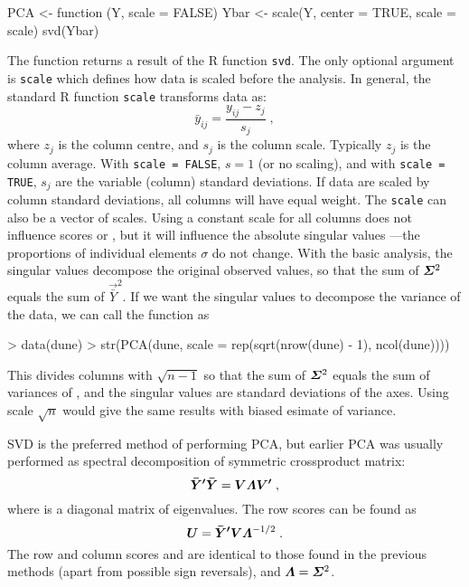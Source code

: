 \begin{Schunk}
\begin{Soutput}
PCA <-
function (Y, scale = FALSE) 
{
    Ybar <- scale(Y, center = TRUE, scale = scale)
    svd(Ybar)
}
\end{Soutput}
\end{Schunk}
The function returns a result of the R function \texttt{svd}. The only
optional argument is \texttt{scale} which defines how data is scaled
before the analysis. In general, the standard R function
\texttt{scale} transforms data as:
\begin{equation}
  \label{eq:PCAstand}
  \bar y_{ij} = \frac{y_{ij} - z_j}{s_j}\;,
\end{equation}
where $z_j$ is the column centre, and $s_j$ is the column
scale. Typically $z_j$ is the column average. With \texttt{scale =
  FALSE}, $s=1$ (or no scaling), and with \texttt{scale = TRUE}, $s_j$
are the variable (column) standard deviations. If data are scaled by
column standard deviations, all columns will have equal weight.  The
\texttt{scale} can also be a vector of scales. Using a constant
scale for all columns does not influence scores  or ,
but it will influence the absolute singular values
\vec{\bSigma}---the proportions of individual elements $\sigma$ do
not change.  With the basic analysis, the singular values decompose
the original observed values, so that the sum of $\vec{\bSigma}^2$
equals the sum of $\vec{\bar Y}^2$. If we want the
singular values to decompose the variance of the data, we can call the
function as

\begin{Schunk}
\begin{Sinput}
> data(dune)
> str(PCA(dune, scale = rep(sqrt(nrow(dune) - 1), ncol(dune))))
\end{Sinput}
\end{Schunk}
This divides columns with $$ so that the sum of
$\vec{\bSigma}^2$ equals the sum of variances of , and the
singular values are standard deviations of the axes.  Using scale
$$ would give the same results with biased esimate of variance.

SVD is the preferred method of performing PCA, but earlier PCA was
usually performed as spectral decomposition of symmetric crossproduct
matrix:
\begin{equation}
  \vec{\bar Y' \bar Y} = \vec{V \bLambda V'}\;,
\end{equation}
where \vec{\bLambda} is a diagonal matrix of eigenvalues. The row
scores can be found as
\begin{equation}
  \label{eq:PCAu}
  \vec{U} = \vec{\bar Y' V \bLambda}^{-1/2}\;.
\end{equation}
The row and column scores  and  are identical to those
found in the previous methods (apart from possible sign reversals),
and $\vec{\bLambda} = \vec{\bSigma}^2$.

